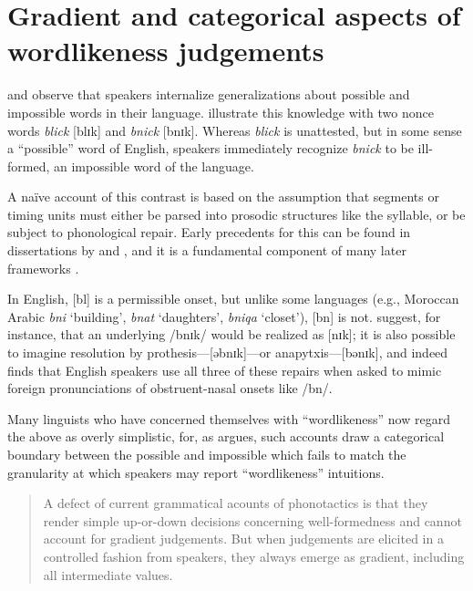 \chapter{Gradient and categorical aspects of wordlikeness judgements} \label{gradience}

\citet{Halle1962} and \citet{Chomsky1965} observe that speakers internalize generalizations about possible and impossible words in their language. \citeauthor{Chomsky1965} illustrate this knowledge with two nonce words \emph{blick} [blɪk] and \emph{bnick} [bnɪk]. Whereas \emph{blick} is unattested, but in some sense a ``possible'' word of English, speakers immediately recognize \emph{bnick} to be ill-formed, an impossible word of the language.

A naïve account of this contrast is based on the assumption that segments or timing units must either be parsed into prosodic structures like the syllable, or be subject to phonological repair. Early precedents for this can be found in dissertations by \citet[10f.]{Hooper1973} and \citet[57f.]{Kahn1976}, and it is a fundamental component of many later frameworks \citep[e.g.,][]{Ito1989a,Noske1992,OT}. 

In English, [bl] is a permissible onset, but unlike some languages (e.g., Moroccan Arabic \emph{bni} `building', \emph{bnat} `daughters', \emph{bniqa} `closet'), [bn] is not. \citet[][19f.]{Wolf2009} suggest, for instance, that an underlying /bnɪk/ would be realized as [nɪk]; it is also possible to imagine resolution by prothesis---[əbnɪk]---or anapytxis---[bənɪk], and indeed \citet{Davidson2006b} finds that English speakers use all three of these repairs when asked to mimic foreign pronunciations of obstruent-nasal onsets like /bn/.

Many linguists who have concerned themselves with ``wordlikeness'' now regard the above as overly simplistic, for, as \citeauthor{Shademan2006} argues, such accounts draw a categorical boundary between the possible and impossible which fails to match the granularity at which speakers may report ``wordlikeness'' intuitions.

\begin{quote}
A defect of current grammatical acounts of phonotactics is that they render simple up-or-down decisions concerning well-formedness and cannot account for gradient judgements. But when judgements are elicited in a controlled fashion from speakers, they always emerge as gradient, including all intermediate values. \citep[][371]{Shademan2006} 
\end{quote}


